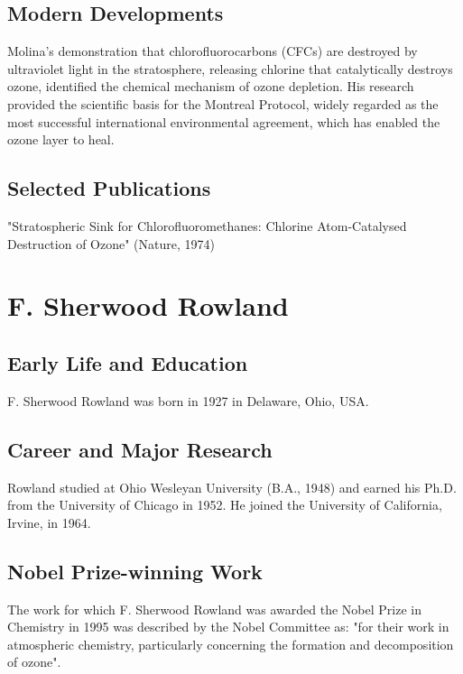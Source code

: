 \subsection*{Modern Developments}

Molina's demonstration that chlorofluorocarbons (CFCs) are destroyed by ultraviolet light in the stratosphere, releasing chlorine that catalytically destroys ozone, identified the chemical mechanism of ozone depletion. His research provided the scientific basis for the Montreal Protocol, widely regarded as the most successful international environmental agreement, which has enabled the ozone layer to heal.

\subsection*{Selected Publications}

"Stratospheric Sink for Chlorofluoromethanes: Chlorine Atom-Catalysed Destruction of Ozone" (Nature, 1974)

\clearpage

\section{F. Sherwood Rowland}

\subsection*{Early Life and Education}

F. Sherwood Rowland was born in 1927 in Delaware, Ohio, USA.

\subsection*{Career and Major Research}

Rowland studied at Ohio Wesleyan University (B.A., 1948) and earned his Ph.D. from the University of Chicago in 1952. He joined the University of California, Irvine, in 1964.

\subsection*{Nobel Prize-winning Work}

The work for which F. Sherwood Rowland was awarded the Nobel Prize in Chemistry in 1995 was described by the Nobel Committee as: "for their work in atmospheric chemistry, particularly concerning the formation and decomposition of ozone".


